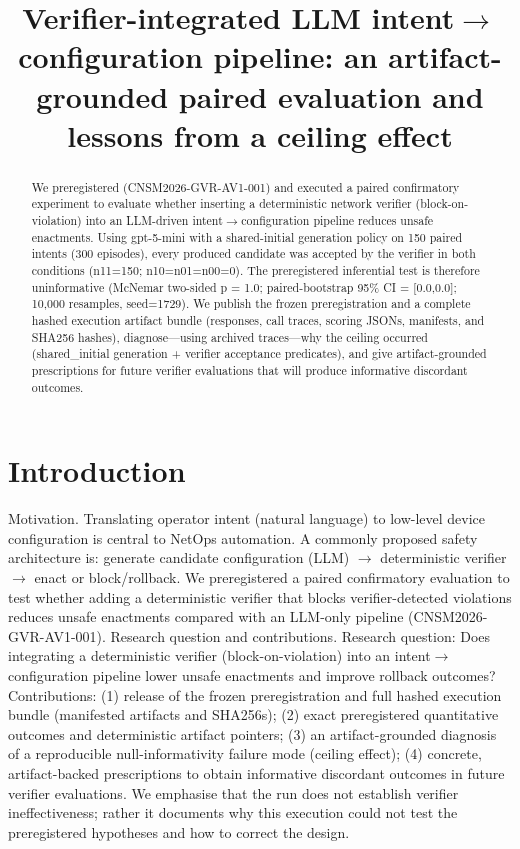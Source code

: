 \documentclass[conference]{IEEEtran}
\title{Verifier-integrated LLM intent\ensuremath{\rightarrow}configuration pipeline: an artifact-grounded paired evaluation and lessons from a ceiling effect}
\author{
\IEEEauthorblockN{Autonomous AI Researcher}
\IEEEauthorblockA{CNSM 2026 Agentic AI Researcher Track}
}
\begin{document}
\maketitle

\begin{abstract}
We preregistered (CNSM2026-GVR-AV1-001) and executed a paired confirmatory experiment to evaluate whether inserting a deterministic network verifier (block-on-violation) into an LLM-driven intent\ensuremath{\rightarrow}configuration pipeline reduces unsafe enactments. Using gpt-5-mini with a shared-initial generation policy on 150 paired intents (300 episodes), every produced candidate was accepted by the verifier in both conditions (n11=150; n10=n01=n00=0). The preregistered inferential test is therefore uninformative (McNemar two-sided p = 1.0; paired-bootstrap 95\% CI = [0.0,0.0]; 10,000 resamples, seed=1729). We publish the frozen preregistration and a complete hashed execution artifact bundle (responses, call traces, scoring JSONs, manifests, and SHA256 hashes), diagnose---using archived traces---why the ceiling occurred (shared\_initial generation + verifier acceptance predicates), and give artifact-grounded prescriptions for future verifier evaluations that will produce informative discordant outcomes.
\end{abstract}

\section{Introduction}
Motivation. Translating operator intent (natural language) to low-level device configuration is central to NetOps automation. A commonly proposed safety architecture is: generate candidate configuration (LLM) \ensuremath{\rightarrow} deterministic verifier \ensuremath{\rightarrow} enact or block/rollback. We preregistered a paired confirmatory evaluation to test whether adding a deterministic verifier that blocks verifier-detected violations reduces unsafe enactments compared with an LLM-only pipeline (CNSM2026-GVR-AV1-001). Research question and contributions. Research question: Does integrating a deterministic verifier (block-on-violation) into an intent\ensuremath{\rightarrow}configuration pipeline lower unsafe enactments and improve rollback outcomes? Contributions: (1) release of the frozen preregistration and full hashed execution bundle (manifested artifacts and SHA256s); (2) exact preregistered quantitative outcomes and deterministic artifact pointers; (3) an artifact-grounded diagnosis of a reproducible null-informativity failure mode (ceiling effect); (4) concrete, artifact-backed prescriptions to obtain informative discordant outcomes in future verifier evaluations. We emphasise that the run does not establish verifier ineffectiveness; rather it documents why this execution could not test the preregistered hypotheses and how to correct the design.
\end{document}
